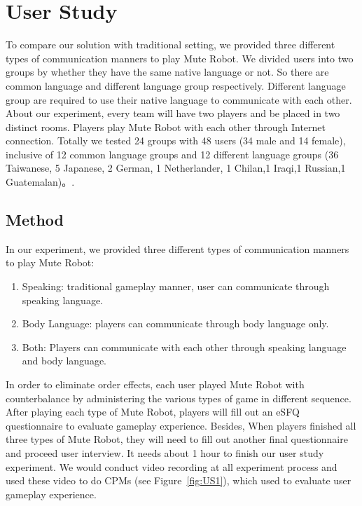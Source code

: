 

\section{User Study}

To compare our solution with traditional setting, we provided three different types of communication manners to play Mute Robot. We divided users into two groups by whether they have the same native language or not. So there are common language and different language group respectively. Different language group are required to use their native language to communicate with each other. About our experiment, every team will have two players and be placed in two distinct rooms. Players play Mute Robot with each other through Internet connection. Totally we tested 24 groups with 48 users (34 male and 14 female), inclusive of 12 common language groups and 12 different language groups (36 Taiwanese, 5 Japanese, 2 German, 1 Netherlander,  1 Chilan,1 Iraqi,1 Russian,1 Guatemalan)。.

\subsection{Method}

In our experiment, we provided three different types of communication manners to play Mute Robot:
\begin{enumerate}
    \item Speaking: 
    traditional gameplay manner, user can communicate through speaking language.
    \item Body Language: 
    players can communicate through body language only.
    \item Both:
    Players can communicate with each other through speaking language and body language.
\end{enumerate}

In order to eliminate order effects, each user played Mute Robot with counterbalance by administering the various types of game in different sequence. After playing each type of Mute Robot, players will fill out an eSFQ\cite{eSFQ} questionnaire to evaluate gameplay experience. Besides, When players finished all three types of Mute Robot, they will need to fill out another final questionnaire and proceed user interview. It needs about 1 hour to finish our user study experiment. We would conduct video recording at all experiment process and used these video to do CPMs\cite{CPMs} (see Figure~\ref{fig:US1}), which used to evaluate user gameplay experience.

